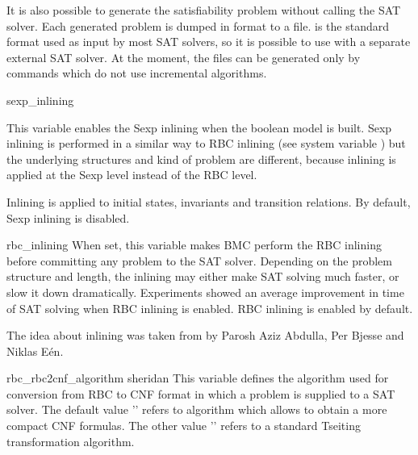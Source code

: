 It is also possible to generate the satisfiability problem without
calling the SAT solver. Each generated problem is dumped in
\dimacs format to a file. \dimacs is the standard format used as input
by most SAT solvers, so it is possible to use \nusmv with a separate
external SAT solver. At the moment, the \dimacs files can be generated only by
commands which do not use incremental algorithms.




\begin{nusmvVar} {sexp\_inlining}{}{}

This variable enables the Sexp inlining when the boolean
model is built. Sexp inlining is performed in a similar way to RBC
inlining (see system variable
) but the underlying 
structures and kind of problem are different, because inlining is applied 
at the Sexp level instead of the RBC level.

Inlining is applied to initial states, invariants and transition
relations. By default, Sexp inlining is disabled.
\end{nusmvVar}

\begin{nusmvVar} {rbc\_inlining}{}{}
When set, this variable makes BMC perform the RBC inlining before
committing any problem to the SAT solver. Depending on the problem
structure and length, the inlining may either make SAT solving
much faster, or slow it down dramatically.
Experiments showed an average improvement in time of SAT solving
when RBC inlining is enabled. RBC inlining is enabled by default.

The idea about inlining was taken from \cite{abdulla00symbolic} by
Parosh Aziz Abdulla, Per Bjesse and Niklas E\'en.
\end{nusmvVar}

\begin{nusmvVar} {rbc\_rbc2cnf\_algorithm}
{}{sheridan}
%
This variable defines the algorithm used for conversion from RBC to
CNF format in which a problem is supplied to a SAT solver. The default
value '' refers to \cite{DBLP:conf/sat/Sheridan04}
algorithm which allows to obtain a more compact CNF formulas.  The
other value '' refers to a standard Tseiting
transformation algorithm.
\end{nusmvVar}








